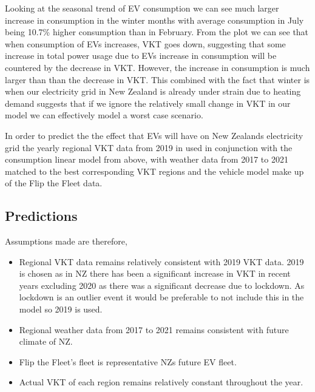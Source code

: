 \documentclass[
]{article}
\begin{document}
Looking at the seasonal trend of EV consumption we can see much larger
increase in consumption in the winter months with average consumption in
July being 10.7\% higher consumption than in February. From the plot we
can see that when consumption of EVs increases, VKT goes down,
suggesting that some increase in total power usage due to EVs increase
in consumption will be countered by the decrease in VKT. However, the
increase in consumption is much larger than than the decrease in VKT.
This combined with the fact that winter is when our electricity grid in
New Zealand is already under strain due to heating demand suggests that
if we ignore the relatively small change in VKT in our model we can
effectively model a worst case scenario.

In order to predict the the effect that EVs will have on New Zealands
electricity grid the yearly regional VKT data from 2019 in used in
conjunction with the consumption linear model from above, with weather
data from 2017 to 2021 matched to the best corresponding VKT regions and
the vehicle model make up of the Flip the Fleet data.

\hypertarget{predictions}{%
\subsection{Predictions}\label{predictions}}

Assumptions made are therefore,

\begin{itemize}
\item Regional VKT data remains relatively consistent with 2019 VKT data. 2019 is chosen as in NZ there has been a significant increase in VKT in recent years excluding 2020 as there was a significant decrease due to lockdown. As lockdown is an outlier event it would be preferable to not include this in the model so 2019 is used.
\item Regional weather data from 2017 to 2021 remains consistent with future climate of NZ.
\item Flip the Fleet's fleet is representative NZs future EV fleet.
\item Actual VKT of each region remains relatively constant throughout the year.
\end{itemize}
\end{document}
